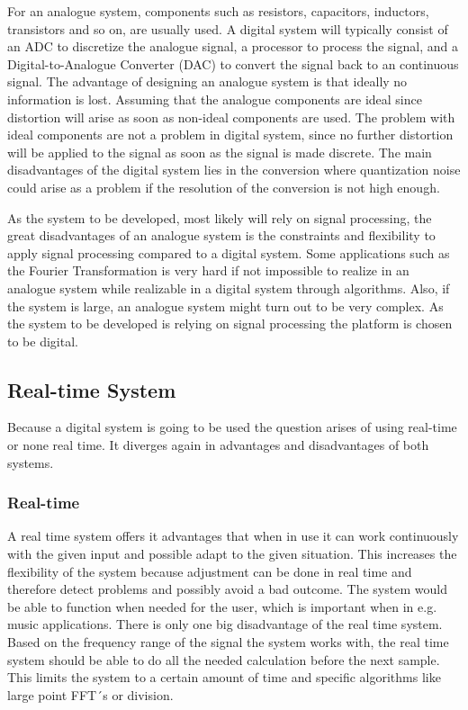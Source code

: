 For an analogue system, components such as resistors, capacitors, inductors, transistors and so on, are usually used. A digital system will typically consist of an ADC to discretize the analogue signal, a processor to process the signal, and a Digital-to-Analogue Converter (DAC) to convert the signal back to an continuous signal. The advantage of designing an analogue system is that ideally no information is lost. Assuming that the analogue components are ideal since distortion will arise as soon as non-ideal components are used. The problem with ideal components are not a problem in digital system, since no further distortion will be applied to the signal as soon as the signal is made discrete. The main disadvantages of the digital system lies in the conversion where quantization noise could arise as a problem if the resolution of the conversion is not high enough. 

As the system to be developed, most likely will rely on signal processing, the great disadvantages of an analogue system is the constraints and flexibility to apply signal processing compared to a digital system. Some applications such as the Fourier Transformation is very hard if not impossible to realize in an analogue system while realizable in a digital system through algorithms. Also, if the system is large, an analogue system might turn out to be very complex.%
As the system to be developed is relying on signal processing the platform is chosen to be digital.

\subsection{Real-time System} \label{sec:RealTime}
Because a digital system is going to be used the question arises of using real-time or none real time. It diverges again in advantages and disadvantages of both systems. %

\subsubsection*{Real-time}
A real time system offers it advantages that when in use it can work continuously with the given input and possible adapt to the given situation. This increases the flexibility of the system because adjustment can be done in real time and therefore detect problems and possibly avoid a bad outcome. 
The system would be able to function when needed for the user, which is important when in e.g. music applications. There is only one big disadvantage of the real time system. Based on the frequency range of the signal the system works with, the real time system should be able to do all the needed calculation before the next sample. This limits the system to a certain amount of time and specific algorithms like large point FFT´s or division. %

